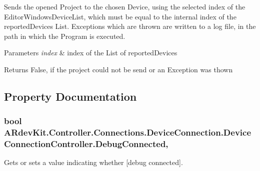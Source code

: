 Sends the opened Project to the chosen Device, using the selected index of the Editor\-Windows\-Device\-List, which must be equal to the internal index of the reported\-Devices List. Exceptions which are thrown are written to a log file, in the path in which the Program is executed. 


\begin{DoxyParams}{Parameters}
{\em index} & index of the List of reported\-Devices\\
\hline
\end{DoxyParams}
\begin{DoxyReturn}{Returns}
False, if the project could not be send or an Exception was thown
\end{DoxyReturn}


\subsection{Property Documentation}
\hypertarget{class_a_rdev_kit_1_1_controller_1_1_connections_1_1_device_connection_1_1_device_connection_controller_a6e1f49d1912fccc6edc212acbfc74c05}{
\subsubsection[{Debug\-Connected}]{\setlength{\rightskip}{0pt plus 5cm}bool A\-Rdev\-Kit.\-Controller.\-Connections.\-Device\-Connection.\-Device\-Connection\-Controller.\-Debug\-Connected\hspace{0.3cm}{\ttfamily [get]}, {\ttfamily [set]}}}\label{class_a_rdev_kit_1_1_controller_1_1_connections_1_1_device_connection_1_1_device_connection_controller_a6e1f49d1912fccc6edc212acbfc74c05}


Gets or sets a value indicating whether \mbox{[}debug connected\mbox{]}. 

